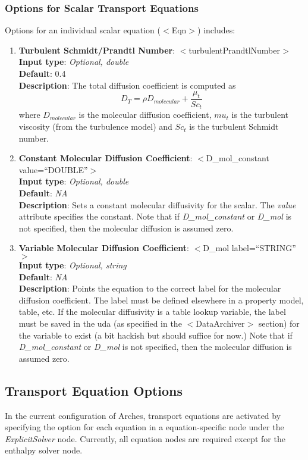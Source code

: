 \subsubsection{Options for Scalar Transport Equations} 
%
Options for an individual scalar equation ($<$Eqn$>$) includes:   
\begin{enumerate}
%
\item {\bf Turbulent Schmidt/Prandtl Number}: $<$turbulentPrandtlNumber$>$ \\
{\bf Input type}: {\it Optional, double} \\
{\bf Default}: 0.4 \\
{\bf Description}: The total diffusion coefficient is computed as 
\[
D_T = \rho D_{molecular} + \frac{\mu_t}{Sc_t}
\]
where $D_{molecular}$ is the molecular diffusion coefficient, $mu_t$ is the turbulent viscosity (from the turbulence model) and $Sc_t$ is the turbulent Schmidt number.  
\item {\bf Constant Molecular Diffusion Coefficient}: $<$D\_mol\_constant value=``DOUBLE''$>$ \\
{\bf Input type}: {\it Optional, double} \\
{\bf Default}: {\it NA} \\
{\bf Description}: Sets a constant molecular diffusivity for the scalar.  The {\it value} attribute specifies the constant.  Note that if {\it D\_mol\_constant} or {\it D_mol} is not specified, then the molecular diffusion is assumed zero. 
\item {\bf Variable Molecular Diffusion Coefficient}: $<$D\_mol label=``STRING''$>$ \\
{\bf Input type}: {\it Optional, string} \\
{\bf Default}: {\it NA} \\
{\bf Description}: Points the equation to the correct label for the molecular diffusion coefficient.  The label must be defined elsewhere in a property model, table, etc.  If the molecular diffusivity is a table lookup variable, the label must be saved in the uda (as specified in the $<$DataArchiver$>$ section) for the variable to exist (a bit hackish but should suffice for now.) Note that if {\it D\_mol\_constant} or {\it D_mol} is not specified, then the molecular diffusion is assumed zero.
%
\end{enumerate}

\subsection{Transport Equation Options}\label{Sec:Eqns_options}
In the current configuration of Arches, transport equations are activated by specifying the option for each equation in a equation-specific node under the {\it ExplicitSolver} node.  Currently, all equation nodes are required except for the enthalpy solver node.  

